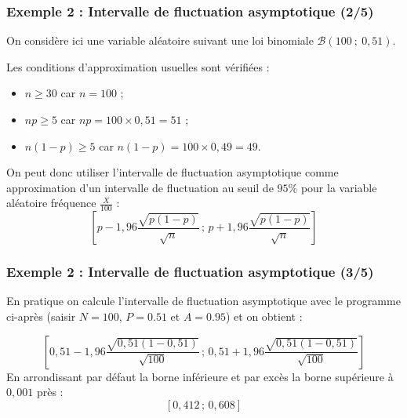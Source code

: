 \documentclass[xcolor=svgnames,t,final]{beamer}
\newcommand{\Interff}[2]{\left[#1\, ;\, #2\right]}
\newcommand{\loibinom}[2]{\mathcal{B}\left(#1\ ; \ #2 \right)}
\begin{document}
\begin{frame}

\frametitle{Exemple 2 : Intervalle de fluctuation  asymptotique (2/5)}

On considère ici une variable aléatoire suivant une loi binomiale $ \loibinom{100}{0,51}$.

Les conditions d'approximation usuelles sont vérifiées :

\begin{itemize}

	\item $n \geqslant 30$ car $n = 100$ ;
	
	\item $np \geqslant 5$ car $np = 100 \times 0,51 = 51$ ;
	
	\item $n(1-p) \geqslant 5$ car $n(1-p) = 100 \times 0,49 = 49$.
	
\end{itemize}

On peut donc utiliser l'intervalle de fluctuation asymptotique comme approximation d'un intervalle de fluctuation au seuil de $95 \%$ pour la variable aléatoire fréquence $\frac{X}{100}$ :
\begin{equation*}
\Interff{p-1,96\frac{\sqrt{p(1-p)}}{\sqrt{n}}}{p+1,96\frac{\sqrt{p(1-p)}}{\sqrt{n}}}
\end{equation*}

\end{frame}
 

\begin{frame}

\frametitle{Exemple 2 : Intervalle de fluctuation  asymptotique (3/5)}

En pratique on calcule l'intervalle de fluctuation asymptotique avec le programme ci-après (saisir $N=100$, $P= 0.51$ et $A=0.95$) et on obtient :

\begin{equation*}
\Interff{0,51-1,96\frac{\sqrt{0,51(1-0,51)}}{\sqrt{100}}}{0,51+1,96\frac{\sqrt{0,51(1-0,51)}}{\sqrt{100}}}
\end{equation*}
En arrondissant par défaut la borne inférieure et par excès la borne supérieure  à $0,001$ près : 
\begin{equation*}
\boxed{\Interff{0,412}{0,608}}
\end{equation*}

\end{frame}
\end{document}

